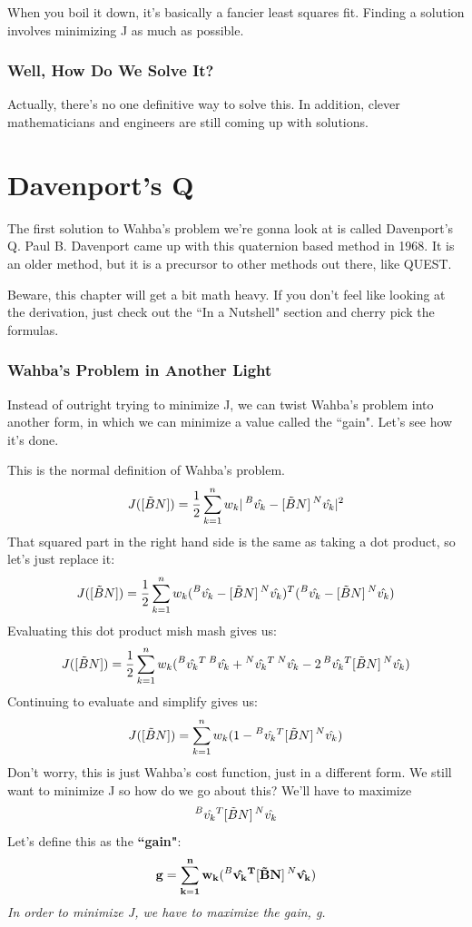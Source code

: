 \documentclass[a4paper,14pt]{extreport}
\newcommand{\vk}[1]{\prescript{#1}{}{\hat{v_k}}}
\begin{document}
When you boil it down, it's basically a fancier least squares fit. Finding a solution involves minimizing J as much as possible.

\subsection{Well, How Do We Solve It?}
Actually, there's no one definitive way to solve this. In addition, clever mathematicians and engineers are still coming up with solutions.
\chapter{Davenport's Q}
The first solution to Wahba's problem we're gonna look at is called Davenport's Q. Paul B. Davenport came up with this quaternion based method in 1968. It is an older method, but it is a precursor to other methods out there, like QUEST. 

Beware, this chapter will get a bit math heavy. If you don't feel like looking at the derivation, just check out the ``In a Nutshell" section and cherry pick the formulas.

\subsection{Wahba's Problem in Another Light}
Instead of outright trying to minimize J, we can twist Wahba's problem into another form, in which we can minimize a value called the ``gain". Let's see how it's done. 

This is the normal definition of Wahba's problem.
\[
J([\tilde{B}N]) = \dfrac{1}{2} \sum^n_{k=1} w_k |\vk{B} - [\tilde{B}N]\vk{N}|^2
\]
That squared part in the right hand side is the same as taking a dot product, so let's just replace it:
\[
J([\tilde{B}N]) = \dfrac{1}{2} \sum^n_{k=1} w_k (\vk{B} - [\tilde{B}N]\vk{N})^T(\vk{B} - [\tilde{B}N]\vk{N})
\]
Evaluating this dot product mish mash gives us:
\[
J([\tilde{B}N]) = \dfrac{1}{2} \sum^n_{k=1} w_k (\vk{B}^T\vk{B}+\vk{N}^T\vk{N}-2\vk{B}^T[\tilde{B}N]\vk{N})
\]
Continuing to evaluate and simplify gives us:
\[
J([\tilde{B}N]) = \sum^n_{k=1} w_k (1- \vk{B}^T[\tilde{B}N]\vk{N})
\]
Don't worry, this is just Wahba's cost function, just in a different form. We still want to minimize J so how do we go about this? We'll have to maximize $$\vk{B}^T[\tilde{B}N]\vk{N}$$ Let's define this as the \textbf{``gain"}:
\[
\mathbf{
g = \sum^n_{k=1} w_k (\vk{B}^T[\tilde{B}N]\vk{N})}
\]
\emph{In order to minimize J, we have to maximize the gain, g.}
\end{document}
